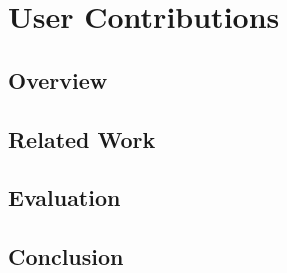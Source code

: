 \chapter{User Contributions}

    \section{Overview}
    \section{Related Work}
    \section{Evaluation}
    \section{Conclusion}

